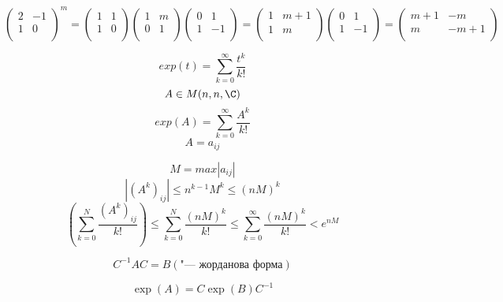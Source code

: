 \begin{enumerate}
$$
\begin{pmatrix}
2&-1\\
1&0\\
\end{pmatrix}^m = 
\begin{pmatrix}
1&1\\
1&0\\
\end{pmatrix} \begin{pmatrix}
1&m\\
0&1\\
\end{pmatrix} \begin{pmatrix}
0&1\\
1&-1\\
\end{pmatrix} = 
\begin{pmatrix}
1&m + 1\\
1&m\\
\end{pmatrix} \begin{pmatrix}
0&1\\
1&-1\\
\end{pmatrix} = 
\begin{pmatrix}
m + 1& -m\\
m& -m + 1\\
\end{pmatrix}
$$

$$exp(t) = \sum_{k = 0}^{\infty}\frac{t^k}{k!}$$ 
$$A \in M(n, n, \C)$$
$$exp(A) = \sum_{k = 0}^{\infty}\frac{A^k}{k!}$$
$$A = a_{ij} $$

$$M = max|a_{ij}|$$
$$|(A^k)_{ij}| \le n^{k - 1}M^{k} \le (nM)^k$$
$$(\sum_{k = 0}^{N}\frac{(A^k)_{ij}}{k!}) \le \sum_{k = 0}^{N}\frac{(nM)^k}{k!} \le
\sum_{k = 0}^{\infty}\frac{(nM)^k}{k!} < e^{nM}$$

$$C^{-1}AC = B(\text{"--- жорданова форма})$$

$$\exp(A) = C \exp(B)C^{-1}$$

\end{enumerate}
                  